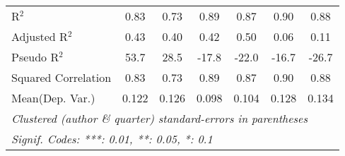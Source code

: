 \begin{tabular}{lcccccc}
   R$^2$                                                      & 0.83    & 0.73    & 0.89    & 0.87         & 0.90         & 0.88\\  
   Adjusted R$^2$                                             & 0.43    & 0.40    & 0.42    & 0.50         & 0.06         & 0.11\\  
   Pseudo R$^2$                                               & 53.7    & 28.5    & -17.8   & -22.0        & -16.7        & -26.7\\  
   Squared Correlation                                        & 0.83    & 0.73    & 0.89    & 0.87         & 0.90         & 0.88\\  
Mean(Dep. Var.) & 0.122 & 0.126 & 0.098 & 0.104 & 0.128 & 0.134 \\
   \midrule \midrule
   \multicolumn{7}{l}{\emph{Clustered (author \& quarter) standard-errors in parentheses}}\\
   \multicolumn{7}{l}{\emph{Signif. Codes: ***: 0.01, **: 0.05, *: 0.1}}\\
\end{tabular}
\par\endgroup
